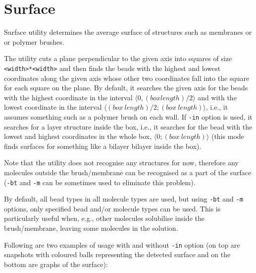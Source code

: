 \section{Surface} \label{sec:Surface}

Surface utility determines the average surface of structures such as
membranes or or polymer brushes.

The utility cuts a plane perpendicular to the given axis into squares of
size \texttt{<width>*<width>} and then finds the beads with the highest and
lowest coordinates along the given axis whose other two coordinates fall
into the square for each square on the plane. By default, it searches the
given axis for the beads with the highest coordinate in the interval
$\langle0, (box length)/2\rangle$ and with the lowest coordinate in the
interval $\langle(box\ length)/2; (box\ length)\rangle$, i.e., it assumes
something such as a polymer brush on each wall. If \texttt{-in}
option is used, it searches for a layer structure inside the box, i.e., it
searches for the bead with the lowest and highest coordinates in the whole
box, $\langle0; (box\ length)\rangle$ (this mode finds surfaces for
something like a bilayer bilayer inside the box).

Note that the utility does not recognise any structures for now, therefore
any molecules outside the brush/membrane can be recognised as a part of the
surface (\texttt{-bt} and \texttt{-m} can be sometimes used to eliminate
this problem).

By default, all bead types in all molecule types are used, but using
\texttt{-bt} and \texttt{-m} options, only specified bead and/or molecule
types can be used. This is particularly useful when, e.g., other molecules
solubilise inside the brush/membrane, leaving some molecules in the
solution.

Following are two examples of usage with and without \texttt{-in} option
(on top are snapshots with coloured balls representing the detected surface
and on the bottom are graphs of the surface):

